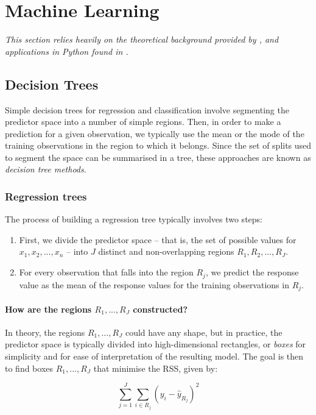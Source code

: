 \section{Machine Learning}
\textit{This section relies heavily on the theoretical background provided by \cite{introR}, and applications in Python found in \cite{mlPython}.}


\subsection{Decision Trees}

Simple decision trees for regression and classification involve segmenting the predictor space into a number of simple regions. Then, in order to make a
prediction for a given observation, we typically use the mean or the mode of the training observations in the region to which it belongs. Since the set of splits used to segment the space can be summarised in a tree, these approaches are known as \textit{decision tree methods}.

\subsubsection{Regression trees}
The process of building a regression tree typically involves two steps:

\begin{enumerate}
    \item First, we divide the predictor space -- that is, the set of possible values for $x_1, x_2, ...,
x_n$ -- into $J$ distinct and non-overlapping regions $R_1, R_2, ..., R_J$.
    \item For every observation that falls into the region $R_j$, we predict the response value as the mean of the response values for the training observations in $R_j$.
\end{enumerate}

\paragraph{How are the regions $R_1, ..., R_J$ constructed?}
In theory, the regions $R_1, ..., R_J$ could have any shape, but in practice, the predictor space is typically divided into high-dimensional
rectangles, or \textit{boxes} for simplicity and for ease of interpretation of the resulting model. The goal is then to find boxes $R_1, ..., R_J$ that minimise the RSS, given by:

\begin{equation}
    \sum_{j=1}^{J} \sum_{i \in R_j} (y_i - \hat{y}_{R_j})^2
\end{equation}

